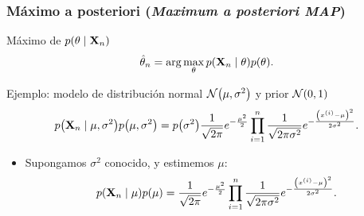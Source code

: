 \documentclass[table]{beamer}
\begin{document}
\begin{frame}
    \frametitle{Máximo a posteriori (\emph{Maximum a posteriori MAP})}
    \begin{block}{Máximo de $\pdf{\theta \mid \Xvec_{n}}$}
        \begin{equation*}
            \hat{\theta}_{n}
            = \arg \max_{\theta} \pdf{\Xvec_{n} \mid \theta} \pdf{\theta} .
        \end{equation*}
    \end{block}
    \begin{exampleblock}{Ejemplo: modelo de distribución normal $\normal{\mu}{\sigma^{2}}$ y prior $\normal{0}{1}$}
        \begin{equation*}
            \pdf{\Xvec_{n} \mid \mu , \sigma^{2}}
            \pdf{\mu , \sigma^{2}}
            = \pdf{\sigma^{2}} \frac{1}{\sqrt{2 \pi}} e^{- \frac{\mu^{2}}{2}} \prod_{i = 1}^{n} \frac{1}{\sqrt{2 \pi \sigma^{2}}} e^{- \frac{\parens{x^{\parens{i}} - \mu}^{2}}{2 \sigma^{2}}} .
        \end{equation*}
        \begin{itemize}
            \item Supongamos $\sigma^{2}$ conocido, y estimemos $\mu$:
                \begin{equation*}
                    \pdf{\Xvec_{n} \mid \mu}
                    \pdf{\mu}
                    = \frac{1}{\sqrt{2 \pi}} e^{- \frac{\mu^{2}}{2}} \prod_{i = 1}^{n} \frac{1}{\sqrt{2 \pi \sigma^{2}}} e^{- \frac{\parens{x^{\parens{i}} - \mu}^{2}}{2 \sigma^{2}}} .
                \end{equation*}
        \end{itemize}
    \end{exampleblock}
\end{frame}
\end{document}
